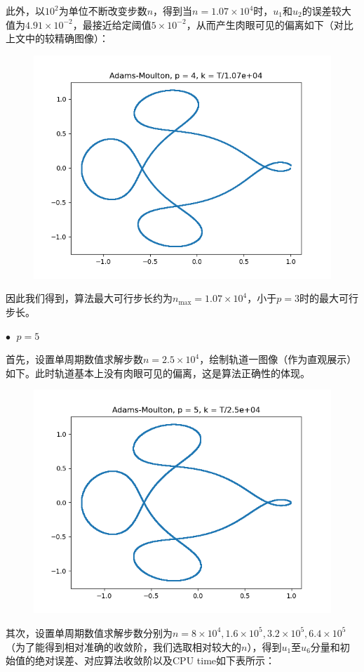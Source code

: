 \documentclass{ctexart}
\begin{document}
\begin{sloppypar}
此外，以$10^2$为单位不断改变步数$n$，得到当$n = 1.07 \times 10^4$时，$u_1$和$u_2$的误差较大值为$4.91 \times 10^{-2}$，最接近给定阈值$5 \times 10^{-2}$，从而产生肉眼可见的偏离如下（对比上文中的较精确图像）：
\begin{figure}[H]
\centering
\includegraphics[scale = 0.45]{./report_src/Figure_14.png}
\end{figure}
因此我们得到，算法最大可行步长约为$n_{\max} = 1.07 \times 10^4$，小于$p=3$时的最大可行步长。

$\bullet \;$ $p = 5$

首先，设置单周期数值求解步数$n = 2.5 \times 10^4$，绘制轨道一图像（作为直观展示）如下。此时轨道基本上没有肉眼可见的偏离，这是算法正确性的体现。
\begin{figure}[H]
\centering
\includegraphics[scale = 0.45]{./report_src/Figure_15.png}
\end{figure}
其次，设置单周期数值求解步数分别为$n = 8 \times 10^4,1.6 \times 10^5,3.2 \times 10^5, 6.4 \times 10^5$（为了能得到相对准确的收敛阶，我们选取相对较大的$n$），得到$u_1$至$u_6$分量和初始值的绝对误差、对应算法收敛阶以及CPU time如下表所示：


\end{sloppypar}
\end{document}
